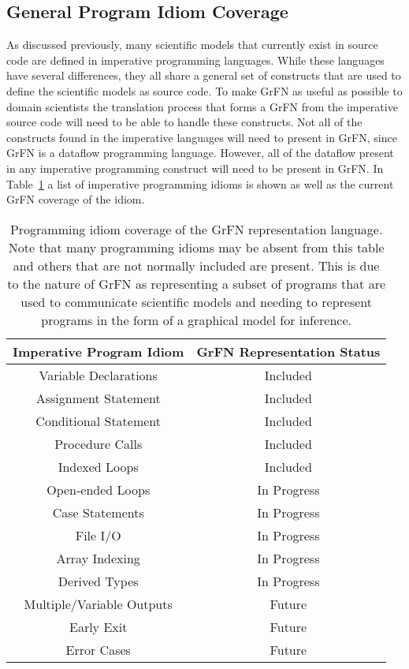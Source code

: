 \subsection{General Program Idiom Coverage\label{sec:supported_program_constructs}}
As discussed previously, many scientific models that currently exist in source code are defined in imperative programming languages.
While these languages have several differences, they all share a general set of constructs that are used to define the scientific models as source code.
To make GrFN as useful as possible to domain scientists the translation process that forms a GrFN from the imperative source code will need to be able to handle these constructs.
Not all of the constructs found in the imperative languages will need to present in GrFN, since GrFN is a dataflow programming language.
However, all of the dataflow present in any imperative programming construct will need to be present in GrFN.
In Table~\ref{tab:prog_idioms} a list of imperative programming idioms is shown as well as the current GrFN coverage of the idiom.

\FloatBarrier
\begin{table}
  \centering
  \label{tab:prog_idioms}
  \begin{tabular}{ |c|c| }
   \hline
   \textbf{Imperative Program Idiom} & \textbf{GrFN Representation Status} \\
   \hline
   Variable Declarations & Included \\
   Assignment Statement & Included \\
   Conditional Statement & Included \\
   Procedure Calls & Included \\
   Indexed Loops & Included \\
   Open-ended Loops & In Progress \\
   Case Statements & In Progress \\
   File I/O & In Progress \\
   Array Indexing & In Progress \\
   Derived Types & In Progress \\
   Multiple/Variable Outputs & Future \\
   Early Exit & Future \\
   Error Cases & Future \\
   \hline
  \end{tabular}
  \caption[GrFN Program Idiom Coverage]{Programming idiom coverage of the GrFN representation language. Note that many programming idioms may be absent from this table and others that are not normally included are present. This is due to the nature of GrFN as representing a subset of programs that are used to communicate scientific models and needing to represent programs in the form of a graphical model for inference.}
\end{table}
\FloatBarrier

